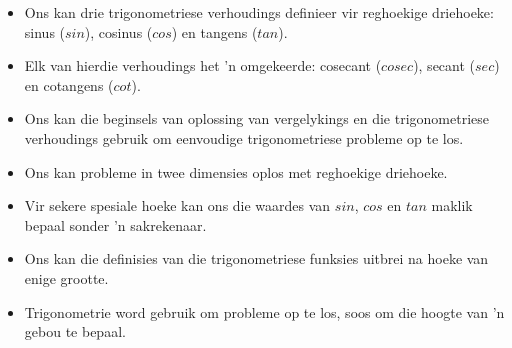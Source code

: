 
\begin{itemize}[noitemsep]
\item Ons kan drie trigonometriese verhoudings definieer vir reghoekige driehoeke: sinus ($sin$), cosinus ($cos$) en tangens ($tan$).
\item Elk van hierdie verhoudings het 'n omgekeerde: cosecant ($cosec$), secant ($sec$) en cotangens ($cot$).
\item Ons kan die beginsels van oplossing van vergelykings en die trigonometriese verhoudings gebruik om eenvoudige trigonometriese probleme op te los.
\item Ons kan probleme in twee dimensies oplos met reghoekige driehoeke.
\item Vir sekere spesiale hoeke kan ons die waardes van $sin$, $cos$ en $tan$ maklik bepaal sonder 'n sakrekenaar.
\item Ons kan die definisies van die trigonometriese funksies uitbrei na hoeke van enige grootte.
\item Trigonometrie word gebruik om probleme op te los, soos om die hoogte van 'n gebou te bepaal.
\end{itemize}


